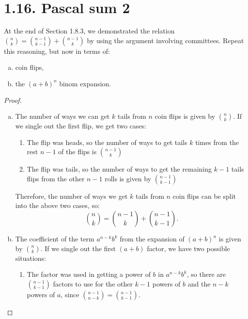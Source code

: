     \section*{1.16. Pascal sum 2}
    At the end of Section 1.8.3, we demonstrated the relation 
    $\binom{n}{k} = \binom{n - 1}{k - 1} + \binom{n - 1}{k}$
    by using the argument involving committees. Repeat this reasoning,
    but now in terms of:
    \begin{enumerate}[(a)]
        \item coin flips,
        \item the $(a + b)^n$ binom expansion.
    \end{enumerate}

    \vspace{2em}

    \begin{proof}
        \hfill
        \begin{enumerate}[(a)]
            \item The number of ways we can get $k$ tails from $n$ coin flips is given by 
                $\binom{n}{k}$. If we single out the first flip, we get two cases:
                \begin{enumerate}[(1)]
                    \item The flip was heads, so the number of ways to get tails $k$ times
                        from the rest $n - 1$ of the flips is $\binom{n - 1}{k}$

                    \item The flip was tails, so the number of ways to get the remaining 
                        $k - 1$ tails flips from the other $n - 1$ rolls is given by $\binom{n - 1}{k - 1}$
                \end{enumerate}

            Therefore, the number of ways we get $k$ tails from $n$ coin flips can be split into the above
            two cases, so:
            \[
                \binom{n}{k} = \binom{n - 1}{k} + \binom{n - 1}{k - 1}
            .\] 

        \item The coefficient of the term $a^{n - k}b^k$ from the expansion of $(a + b)^n$ is given by 
            $\binom{n}{k}$. If we single out the first $(a + b)$ factor, we have two possible situations:
            \begin{enumerate}
                \item The factor was used in getting a power of $b$ in $a^{n - k}b^k$, so there are 
                    $\binom{n - 1}{k - 1}$ factors to use for the other $k - 1$ powers of $b$ and the $n - k$ 
                    powers of $a$, since 
                    $\binom{n - 1}{n - k} = \binom{n - 1}{k - 1}$.


\end{enumerate}
\end{enumerate}
\end{proof}
